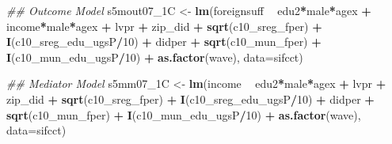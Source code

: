 \documentclass[
]{article}
\newenvironment{Shaded}{\begin{snugshade}}{\end{snugshade}}
\newcommand{\CommentTok}[1]{\textcolor[rgb]{0.56,0.35,0.01}{\textit{#1}}}
\newcommand{\DataTypeTok}[1]{\textcolor[rgb]{0.13,0.29,0.53}{#1}}
\newcommand{\DecValTok}[1]{\textcolor[rgb]{0.00,0.00,0.81}{#1}}
\newcommand{\KeywordTok}[1]{\textcolor[rgb]{0.13,0.29,0.53}{\textbf{#1}}}
\newcommand{\NormalTok}[1]{#1}
\newcommand{\OperatorTok}[1]{\textcolor[rgb]{0.81,0.36,0.00}{\textbf{#1}}}
\newcommand{\StringTok}[1]{\textcolor[rgb]{0.31,0.60,0.02}{#1}}
\begin{document}
\begin{Shaded}
\begin{Highlighting}[]
\CommentTok{## Outcome Model }
\NormalTok{s5mout07_1C <-}\StringTok{ }\KeywordTok{lm}\NormalTok{(foreignsuff  }\OperatorTok{~}\StringTok{ }\NormalTok{edu2}\OperatorTok{*}\NormalTok{male}\OperatorTok{*}\NormalTok{agex }\OperatorTok{+}\StringTok{ }\NormalTok{income}\OperatorTok{*}\NormalTok{male}\OperatorTok{*}\NormalTok{agex }\OperatorTok{+}\StringTok{ }\NormalTok{lvpr }\OperatorTok{+}\StringTok{  }
\StringTok{                    }\NormalTok{zip_did }\OperatorTok{+}\StringTok{ }\KeywordTok{sqrt}\NormalTok{(c10_sreg_fper) }\OperatorTok{+}\StringTok{ }\KeywordTok{I}\NormalTok{(c10_sreg_edu_ugsP}\OperatorTok{/}\DecValTok{10}\NormalTok{) }\OperatorTok{+}\StringTok{ }
\StringTok{                    }\NormalTok{didper }\OperatorTok{+}\StringTok{ }\KeywordTok{sqrt}\NormalTok{(c10_mun_fper) }\OperatorTok{+}\StringTok{ }\KeywordTok{I}\NormalTok{(c10_mun_edu_ugsP}\OperatorTok{/}\DecValTok{10}\NormalTok{) }\OperatorTok{+}\StringTok{ }
\StringTok{                    }\KeywordTok{as.factor}\NormalTok{(wave), }\DataTypeTok{data=}\NormalTok{sifcct)}

\CommentTok{## Mediator Model}
\NormalTok{s5mm07_1C <-}\StringTok{ }\KeywordTok{lm}\NormalTok{(income  }\OperatorTok{~}\StringTok{ }\NormalTok{edu2}\OperatorTok{*}\NormalTok{male}\OperatorTok{*}\NormalTok{agex }\OperatorTok{+}\StringTok{ }\NormalTok{lvpr }\OperatorTok{+}\StringTok{  }
\StringTok{                  }\NormalTok{zip_did }\OperatorTok{+}\StringTok{ }\KeywordTok{sqrt}\NormalTok{(c10_sreg_fper) }\OperatorTok{+}\StringTok{ }\KeywordTok{I}\NormalTok{(c10_sreg_edu_ugsP}\OperatorTok{/}\DecValTok{10}\NormalTok{) }\OperatorTok{+}\StringTok{ }
\StringTok{                  }\NormalTok{didper }\OperatorTok{+}\StringTok{ }\KeywordTok{sqrt}\NormalTok{(c10_mun_fper) }\OperatorTok{+}\StringTok{ }\KeywordTok{I}\NormalTok{(c10_mun_edu_ugsP}\OperatorTok{/}\DecValTok{10}\NormalTok{) }\OperatorTok{+}\StringTok{ }
\StringTok{                  }\KeywordTok{as.factor}\NormalTok{(wave), }\DataTypeTok{data=}\NormalTok{sifcct)}


\end{Highlighting}
\end{Shaded}
\end{document}
